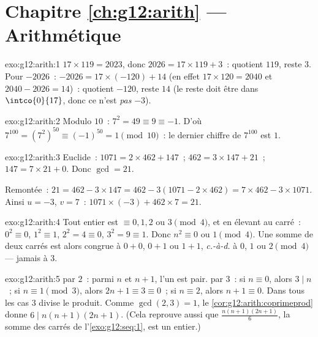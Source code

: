 \section*{Chapitre \ref{ch:g12:arith} --- Arithmétique}

\begin{solution}{exo:g12:arith:1}
$17 \times 119 = 2023$, donc $2026 = 17 \times 119 + 3$~: quotient $119$,
reste $3$. Pour $-2026$~: $-2026 = 17\times(-120) + 14$ (en effet
$17 \times 120 = 2040$ et $2040 - 2026 = 14$)~: quotient $-120$, reste
$14$ (le reste doit être dans $\intco{0}{17}$, donc ce n'est \emph{pas}
$-3$).
\end{solution}

\begin{solution}{exo:g12:arith:2}
Modulo $10$~: $7^2 = 49 \equiv 9 \equiv -1$. D'où
$7^{100} = \left(7^2\right)^{50} \equiv (-1)^{50} = 1 \pmod{10}$~: le
dernier chiffre de $7^{100}$ est $1$.
\end{solution}

\begin{solution}{exo:g12:arith:3}
Euclide~: $1071 = 2\times462 + 147$~; $462 = 3\times147 + 21$~;
$147 = 7\times21 + 0$. Donc $\gcd = 21$.

Remontée~: $21 = 462 - 3\times147 = 462 - 3(1071 - 2\times462)
= 7\times462 - 3\times1071$. Ainsi $u = -3$, $v = 7$~:
$1071\times(-3) + 462\times7 = 21$.
\end{solution}

\begin{solution}{exo:g12:arith:4}
Tout entier est $\equiv 0, 1, 2$ ou $3 \pmod 4$, et en élevant au carré~:
$0^2 \equiv 0$, $1^2 \equiv 1$, $2^2 = 4 \equiv 0$, $3^2 = 9 \equiv 1$.
Donc $n^2 \equiv 0$ ou $1 \pmod 4$. Une somme de deux carrés est alors
congrue à $0 + 0$, $0 + 1$ ou $1 + 1$, \emph{c.-à-d.} à $0$, $1$ ou
$2 \pmod 4$ --- jamais à $3$.
\end{solution}

\begin{solution}{exo:g12:arith:5}
 par $2$~: parmi $n$ et $n + 1$, l'un est pair. 
par $3$~: si $n \equiv 0$, alors $3 \mid n$~; si $n \equiv 1 \pmod 3$,
alors $2n + 1 \equiv 3 \equiv 0$~; si $n \equiv 2$, alors
$n + 1 \equiv 0$. Dans tous les cas $3$ divise le produit. Comme
$\gcd(2,3) = 1$, le \cref{cor:g12:arith:coprimeprod} donne
$6 \mid n(n+1)(2n+1)$.
(Cela reprouve aussi que $\frac{n(n+1)(2n+1)}{6}$, la somme des carrés de
l'\cref{exo:g12:seq:1}, est un entier.)
\end{solution}

